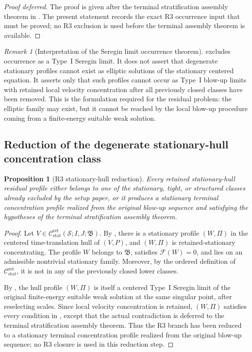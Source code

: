 \documentclass[11pt]{amsart}
\numberwithin{equation}{section}
\theoremstyle{plain}
\newtheorem{proposition}[proposition]{Proposition}
\theoremstyle{definition}
\theoremstyle{remark}
\newtheorem{remark}[remark]{Remark}
\newcommand{\Cstat}{\mathcal C_{\mathrm{stat}}^{\mathrm{ret}}}
\begin{document}
\begin{proof}[Proof deferred]
The proof is given after the terminal stratification assembly theorem in
.  The present statement records the exact R3 occurrence
input that must be proved; no R3 exclusion is used before the terminal
assembly theorem is available.
\end{proof}

\begin{remark}[Interpretation of the Seregin limit occurrence theorem]
\label{rem:R3-input-interpretation}
 excludes occurrence
as a Type~I Seregin limit.  It does not assert that degenerate stationary profiles cannot
exist as elliptic solutions of the stationary centered equation.  It asserts
only that such profiles cannot occur as Type~I blow-up limits with retained
local velocity concentration after all previously closed classes have been removed.  This
is the formulation required for the residual problem: the elliptic family may
exist, but it cannot be reached by the local blow-up procedure coming from a
finite-energy suitable weak solution.
\end{remark}

\subsection{Reduction of the degenerate stationary-hull concentration class}

\begin{proposition}[R3 stationary-hull reduction]
\label{prop:R3-stationary-hull-reduction}
Every retained stationary-hull residual profile either belongs to one of the
stationary, tight, or structured classes already excluded by the setup paper, or it produces a stationary terminal
concentration profile realized from the original blow-up sequence and satisfying the hypotheses of the terminal
stratification assembly theorem.
\end{proposition}

\begin{proof}
Let \(V\in\Cstat(\mathcal S;I,J;\mathfrak B)\).  By
, there is a stationary profile \((W,\Pi)\) in the
centered time-translation hull of \((V,P)\), and \((W,\Pi)\) is
retained-stationary concentrating.  The profile \(W\) belongs to \(\mathfrak B\), satisfies
\(\mathcal F(W)=0\), and lies on an admissible nontrivial stationary family.
Moreover, by the ordered definition of \(\Cstat\), it is not
in any of the previously closed lower classes.

By , the hull profile \((W,\Pi)\) is itself a
centered Type~I Seregin limit of the original finite-energy suitable weak
solution at the same singular point, after reselecting scales.  Since local
velocity concentration is retained, \((W,\Pi)\) satisfies every condition in
, except that the actual
contradiction is deferred to the terminal stratification assembly theorem.  Thus the
R3 branch has been reduced to a stationary terminal concentration profile
realized from the original blow-up sequence; no R3 closure is used in this
reduction step.
\end{proof}
\end{document}
